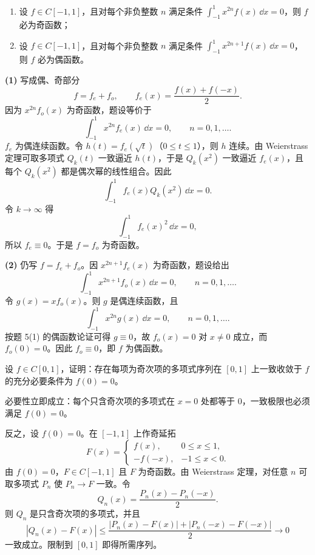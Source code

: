 \begin{xexercise}[5]
\begin{enumerate}[label=(\arabic*)]
\item 设 $f\in C[-1,1]$，且对每个非负整数 $n$ 满足条件 $\int_{-1}^1x^{2n}f(x)\,\dd x=0$，则 $f$ 必为奇函数；
\item 设 $f\in C[-1,1]$，且对每个非负整数 $n$ 满足条件 $\int_{-1}^1x^{2n+1}f(x)\,\dd x=0$，则 $f$ 必为偶函数。
\end{enumerate}
\end{xexercise}
\begin{xsolution}
\textbf{(1)}\quad
写成偶、奇部分
\[
  f=f_e+f_o,
  \qquad
  f_e(x)=\frac{f(x)+f(-x)}2.
\]
因为 $x^{2n}f_o(x)$ 为奇函数，题设等价于
\[
  \int_{-1}^1x^{2n}f_e(x)\,\dd x=0,
  \qquad n=0,1,\ldots.
\]
$f_e$ 为偶连续函数。令 $h(t)=f_e(\sqrt t)$（$0\leqslant t\leqslant1$），则 $h$ 连续。由 Weierstrass 定理可取多项式 $Q_k(t)$ 一致逼近 $h(t)$，于是 $Q_k(x^2)$ 一致逼近 $f_e(x)$，且每个 $Q_k(x^2)$ 都是偶次幂的线性组合。因此
\[
  \int_{-1}^1f_e(x)Q_k(x^2)\,\dd x=0.
\]
令 $k\to\infty$ 得
\[
  \int_{-1}^1f_e(x)^2\,\dd x=0,
\]
所以 $f_e\equiv0$。于是 $f=f_o$ 为奇函数。

\textbf{(2)}\quad
仍写 $f=f_e+f_o$。因 $x^{2n+1}f_e(x)$ 为奇函数，题设给出
\[
  \int_{-1}^1x^{2n+1}f_o(x)\,\dd x=0,
  \qquad n=0,1,\ldots.
\]
令 $g(x)=xf_o(x)$。则 $g$ 是偶连续函数，且
\[
  \int_{-1}^1x^{2n}g(x)\,\dd x=0,
  \qquad n=0,1,\ldots.
\]
按题 5(1) 的偶函数论证可得 $g\equiv0$，故 $f_o(x)=0$ 对 $x\ne0$ 成立，而 $f_o(0)=0$。因此 $f_o\equiv0$，即 $f$ 为偶函数。
\end{xsolution}


\begin{xexercise}[6]
设 $f\in C[0,1]$，证明：存在每项为奇次项的多项式序列在 $[0,1]$ 上一致收敛于 $f$ 的充分必要条件为 $f(0)=0$。
\end{xexercise}
\begin{xsolution}
必要性立即成立：每个只含奇次项的多项式在 $x=0$ 处都等于 0，一致极限也必须满足 $f(0)=0$。

反之，设 $f(0)=0$。在 $[-1,1]$ 上作奇延拓
\[
  F(x)=
  \begin{cases}
    f(x),&0\leqslant x\leqslant1,\\
    -f(-x),&-1\leqslant x<0.
  \end{cases}
\]
由 $f(0)=0$，$F\in C[-1,1]$ 且 $F$ 为奇函数。由 Weierstrass 定理，对任意 $n$ 可取多项式 $P_n$ 使 $P_n\to F$ 一致。令
\[
  Q_n(x)=\frac{P_n(x)-P_n(-x)}2.
\]
则 $Q_n$ 是只含奇次项的多项式，并且
\[
  |Q_n(x)-F(x)|
  \leqslant\frac{|P_n(x)-F(x)|+|P_n(-x)-F(-x)|}{2}
  \to0
\]
一致成立。限制到 $[0,1]$ 即得所需序列。
\end{xsolution}


